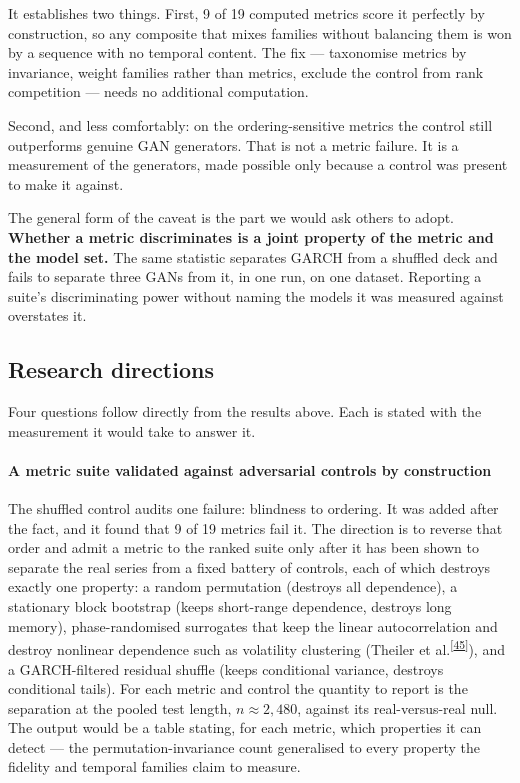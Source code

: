 \documentclass[11pt,a4paper]{article}
\makeatletter
\newcommand{\tcite}[1]{\textsuperscript{[\hyperlink{R:#1}{#1}]}}
\DeclareRobustCommand{\_}{\ifmmode\nfss@text{\textunderscore}\else\textunderscore\allowbreak\fi}
\makeatother
\begin{document}
It establishes two things. First, 9 of 19 computed metrics score it perfectly by construction, so any composite that mixes families without balancing them is won by a sequence with no temporal content. The fix --- taxonomise metrics by invariance, weight families rather than metrics, exclude the control from rank competition --- needs no additional computation.

Second, and less comfortably: on the ordering-sensitive metrics the control still outperforms genuine GAN generators. That is not a metric failure. It is a measurement of the generators, made possible only because a control was present to make it against.

The general form of the caveat is the part we would ask others to adopt. \textbf{Whether a metric discriminates is a joint property of the metric and the model set.} The same statistic separates GARCH from a shuffled deck and fails to separate three GANs from it, in one run, on one dataset. Reporting a suite's discriminating power without naming the models it was measured against overstates it.

\subsection{Research directions}
\label{sec:directions}
Four questions follow directly from the results above. Each is stated with the measurement it would take to answer it.

\paragraph{A metric suite validated against adversarial controls by construction} The shuffled control audits one failure: blindness to ordering. It was added after the fact, and it found that 9 of 19 metrics fail it. The direction is to reverse that order and admit a metric to the ranked suite only after it has been shown to separate the real series from a fixed battery of controls, each of which destroys exactly one property: a random permutation (destroys all dependence), a stationary block bootstrap (keeps short-range dependence, destroys long memory), phase-randomised surrogates that keep the linear autocorrelation and destroy nonlinear dependence such as volatility clustering (Theiler et al.\tcite{45}), and a GARCH-filtered residual shuffle (keeps conditional variance, destroys conditional tails). For each metric and control the quantity to report is the separation at the pooled test length, $n\approx2{,}480$, against its real-versus-real null. The output would be a table stating, for each metric, which properties it can detect --- the permutation-invariance count generalised to every property the fidelity and temporal families claim to measure.
\end{document}
